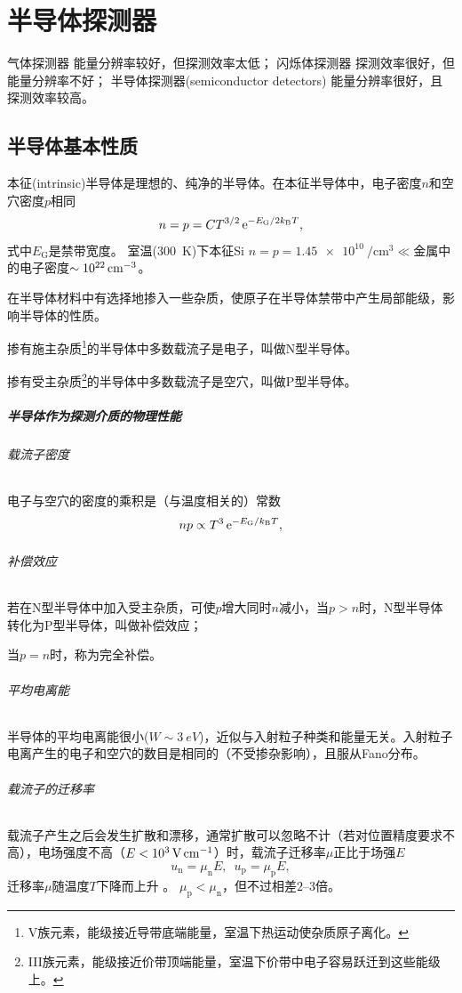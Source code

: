 \chapter{半导体探测器}
气体探测器
能量分辨率较好，但探测效率太低；
闪烁体探测器
探测效率很好，但能量分辨率不好；%
半导体探测器(semiconductor detectors)
能量分辨率很好，且探测效率较高。

\section{半导体基本性质}

本征(intrinsic)半导体是理想的、纯净的半导体。在本征半导体中，电子密度$n$和空穴密度$p$相同
\begin{equation}\label{eq:nrd-intrinsic-carrier-density}
	n = p = CT^{3/2}\mathop{}\!\mathrm{e}^{-E_{\mathrm{G}}/2k_{\mathrm{B}} T},
\end{equation}
式中$E_{\mathrm{G}}$是禁带宽度。
室温(\qty{300}{K})下本征Si $n = p = \qty{1.45e10}{\per\centi\metre\cubed} \ll$金属中的电子密度$\sim \qty{E22}{\per\centi\metre\cubed}$。

在半导体材料中有选择地掺入一些杂质，使原子在半导体禁带中产生局部能级，影响半导体的性质。
\begin{compactitem}
	\item 掺有施主杂质\footnote{V族元素，能级接近导带底端能量，室温下热运动使杂质原子离化。}的半导体中多数载流子是电子，叫做N型半导体。
	\item 掺有受主杂质\footnote{III族元素，能级接近价带顶端能量，室温下价带中电子容易跃迁到这些能级上。}的半导体中多数载流子是空穴，叫做P型半导体。
\end{compactitem}
\paragraph{半导体作为探测介质的物理性能}
\subparagraph{载流子密度}
电子与空穴的密度的乘积是（与温度相关的）常数
\begin{equation}\label{eq:nrd-carrier-mass-action}
	np \propto T^3\mathop{}\!\mathrm{e}^{-E_{\mathrm{G}}/k_{\mathrm{B}} T},
\end{equation}
\subparagraph{补偿效应}
若在N型半导体中加入受主杂质，可使$p$增大同时$n$减小，当$p > n$时，N型半导体转化为P型半导体，叫做补偿效应；

当$p = n$时，称为完全补偿。

\subparagraph{平均电离能}
半导体的平均电离能很小($W \sim \qty{3}{eV}$)，近似与入射粒子种类和能量无关。入射粒子电离产生的电子和空穴的数目是相同的（不受掺杂影响），且服从Fano分布。
\subparagraph{载流子的迁移率}
载流子产生之后会发生扩散和漂移，通常扩散可以忽略不计（若对位置精度要求不高），电场强度不高（$E < \qty{E3}{\volt\per\centi\metre}$）时，载流子迁移率$\mu$正比于场强$E$
\begin{equation}\label{eq:nrd-carrier-drift}
	u_{\mathrm{n}} = \mu_{\mathrm{n}}E,\enspace u_{\mathrm{p}} = \mu_{\mathrm{p}}E,
\end{equation}
迁移率$\mu$随温度$T$下降而上升%
。%
$\mu_{\mathrm{p}} < \mu_{\mathrm{n}}$，但不过相差$\numrange{2}{3}$倍。

